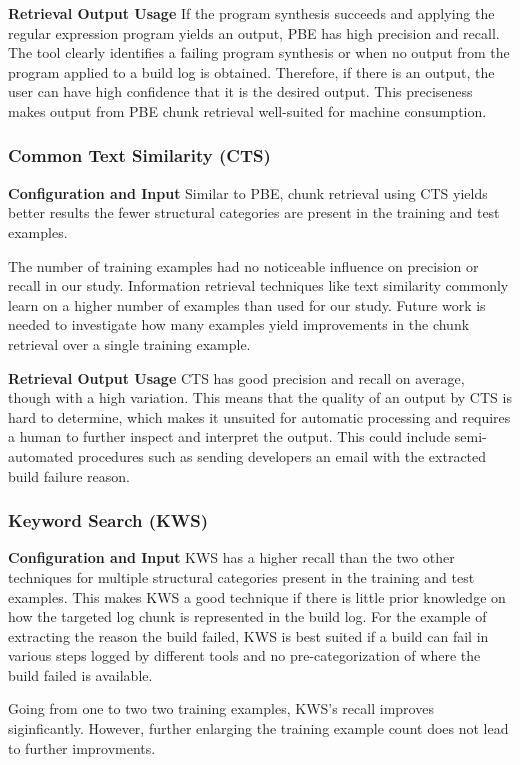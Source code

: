 \noindent
\textbf{Retrieval Output Usage}
If the program synthesis succeeds and applying the regular expression
program yields an output, PBE has high precision and recall.
The tool
clearly identifies a failing program synthesis or when no output from
the program applied to a build log is obtained.
Therefore, if there is
an output, the user can have high confidence that it is the desired
output.
This preciseness makes output from PBE chunk retrieval
well-suited for machine consumption.

\subsubsection{Common Text Similarity (CTS)}
\noindent
\textbf{Configuration and Input}
Similar to PBE, chunk retrieval using CTS yields better results the
fewer structural categories are present in the training and test
examples.

The number of training examples had no noticeable influence on
precision or recall in our study.
Information retrieval techniques
like text similarity commonly learn on a higher number of examples
than used for our study.
Future work is needed to investigate how many
examples yield improvements in the chunk retrieval over a single
training example.

\noindent
\textbf{Retrieval Output Usage}
CTS has good precision and recall on average, though with a high
variation.
This means that the quality of an output by CTS is hard to
determine, which makes it unsuited for automatic  processing and requires
a human to further inspect and interpret the output.
This could include semi-automated procedures such as sending
developers an email with the extracted build failure reason.

\subsubsection{Keyword Search (KWS)}
\noindent
\textbf{Configuration and Input}
KWS has a higher recall than the two other techniques for multiple
structural categories present in the training and test examples.
This
makes KWS a good technique if there is little prior knowledge on how
the targeted log chunk is represented in the build log.
For the
example of extracting the reason the build failed, KWS is best suited
if a build can fail in various steps logged by different tools and no
pre-categorization of where the build failed is available.

Going from one to two two training examples, KWS's recall improves
siginficantly.
However, further enlarging the training example count
does not lead to further improvments.

